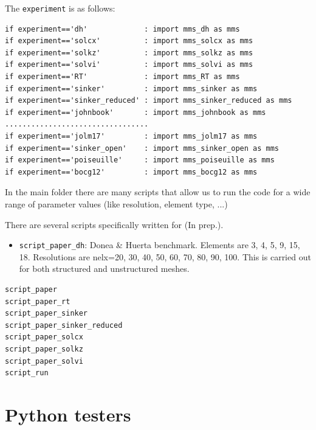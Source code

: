 The \lstinline{experiment} is as follows:
\begin{lstlisting}
if experiment=='dh'             : import mms_dh as mms 
if experiment=='solcx'          : import mms_solcx as mms 
if experiment=='solkz'          : import mms_solkz as mms 
if experiment=='solvi'          : import mms_solvi as mms 
if experiment=='RT'             : import mms_RT as mms 
if experiment=='sinker'         : import mms_sinker as mms 
if experiment=='sinker_reduced' : import mms_sinker_reduced as mms 
if experiment=='johnbook'       : import mms_johnbook as mms 
.................................
if experiment=='jolm17'         : import mms_jolm17 as mms 
if experiment=='sinker_open'    : import mms_sinker_open as mms 
if experiment=='poiseuille'     : import mms_poiseuille as mms 
if experiment=='bocg12'         : import mms_bocg12 as mms 
\end{lstlisting}

In the main folder there are many scripts that allow us to run the code
for a wide range of parameter values (like resolution, element type, ...)

There are several scripts specifically written for 
\textcite{thba24} (In prep.).
\begin{itemize}
\item {\tt script\_paper\_dh}: Donea \& Huerta benchmark.
Elements are 3, 4, 5, 9, 15, 18. 
Resolutions are nelx=20, 30, 40, 50, 60, 70, 80, 90, 100.
This is carried out for both structured and unstructured meshes.
\end{itemize}

\begin{verbatim}
script_paper
script_paper_rt
script_paper_sinker
script_paper_sinker_reduced
script_paper_solcx
script_paper_solkz
script_paper_solvi
script_run
\end{verbatim}


\section*{Python testers}

